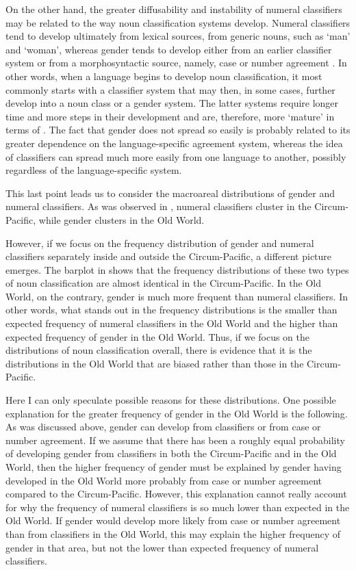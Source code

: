 \documentclass[output=collectionpaper]{langsci/langscibook}
\begin{document}
On the other hand, the greater diffusability and instability of numeral classifiers may be related to the way noun classification systems develop. Numeral classifiers tend to develop ultimately from lexical sources, from generic nouns, such as `man' and `woman', whereas gender tends to develop either from an earlier classifier system or from a morphosyntactic source, namely, case or number agreement \citep{Luraghi2011}. In other words, when a language begins to develop noun classification, it most commonly starts with a classifier system that may then, in some cases, further develop into a noun class or a gender system. The latter systems require longer time and more steps in their development and are, therefore, more `mature' in terms of \citet{Dahl2004}. The fact that gender does not spread so easily is probably related to its greater dependence on the language-specific agreement system, whereas the idea of classifiers can spread much more easily from one language to another, possibly regardless of the language-specific system.

This last point leads us to consider the macroareal distributions of gender and numeral classifiers. As was observed in , numeral classifiers cluster in the Circum-Pacific, while gender clusters in the Old World.

However, if we focus on the frequency distribution of gender and numeral classifiers separately inside and outside the Circum-Pacific, a different picture emerges. The barplot in  shows that the frequency distributions of these two types of noun classification are almost identical in the Circum-Pacific. In the Old World, on the contrary, gender is much more frequent than numeral classifiers. In other words, what stands out in the frequency distributions is the smaller than expected frequency of numeral classifiers in the Old World and the higher than expected frequency of gender in the Old World. Thus, if we focus on the distributions of noun classification overall, there is evidence that it is the distributions in the Old World that are biased rather than those in the Circum-Pacific.

Here I can only speculate possible reasons for these distributions. One possible explanation for the greater frequency of gender in the Old World is the following. As was discussed above, gender can develop from classifiers or from case or number agreement. If we assume that there has been a roughly equal probability of developing gender from classifiers in both the Circum-Pacific and in the Old World, then the higher frequency of gender must be explained by gender having developed in the Old World more probably from case or number agreement compared to the Circum-Pacific. However, this explanation cannot really account for why the frequency of numeral classifiers is so much lower than expected in the Old World. If gender would develop more likely from case or number agreement than from classifiers in the Old World, this may explain the higher frequency of gender in that area, but not the lower than expected frequency of numeral classifiers.
\end{document}
